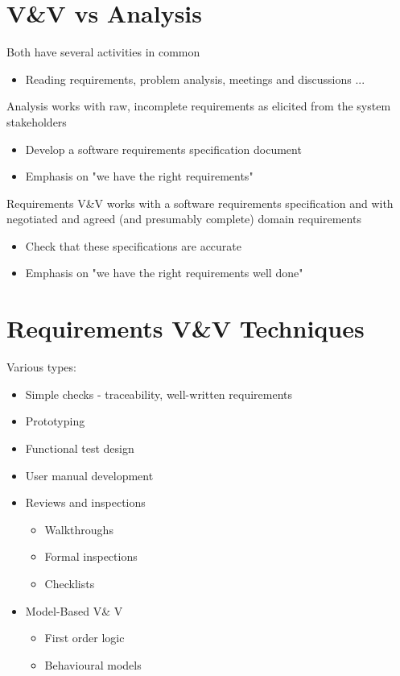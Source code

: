 \documentclass{article}[18pt]
\begin{document}
\section{V\&V vs Analysis}
Both have several activities in common
\begin{itemize}
	\item Reading requirements, problem analysis, meetings and discussions ...
\end{itemize}
Analysis works with raw, incomplete requirements as elicited from the system stakeholders
\begin{itemize}
	\item Develop a software requirements specification document
	\item Emphasis on "we have the right requirements"
\end{itemize}
Requirements V\&V works with a software requirements specification and with negotiated and agreed (and presumably complete) domain requirements
\begin{itemize}
	\item Check that these specifications are accurate
	\item Emphasis on "we have the right requirements well done"
\end{itemize}
\section{Requirements V\&V Techniques}
Various types:
\begin{itemize}
	\item Simple checks  - traceability, well-written requirements
	\item Prototyping
	\item Functional test design
	\item User manual development
	\item Reviews and inspections
	\begin{itemize}
		\item Walkthroughs
		\item Formal inspections
		\item Checklists
	\end{itemize}
	\item Model-Based V\& V
	\begin{itemize}
		\item First order logic
		\item Behavioural models
	\end{itemize}
\end{itemize}
\end{document}
